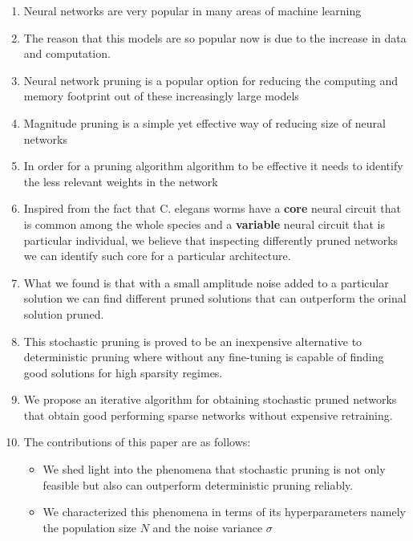 \begin{enumerate}
    \item Neural networks are very popular in many areas of machine learning
    \item The reason that this models are so popular now is due to the increase
        in data and computation.
    \item Neural network pruning is a popular option for reducing the computing
        and memory footprint out of these increasingly large models
    \item Magnitude pruning is a simple yet effective way of reducing size of
        neural networks
    \item In order for a pruning algorithm algorithm to be effective it needs
        to identify the less relevant weights in the network
    \item Inspired from the fact that C. elegans worms have a \textbf{core}
        neural circuit that is common among the whole species and a \textbf{variable}
        neural circuit that is particular individual, we believe that
        inspecting differently pruned networks we can identify such core for a
        particular architecture.
    \item What we found is that with a small amplitude noise added to a
        particular solution we can find different pruned solutions that can
        outperform the orinal solution pruned.
    \item This stochastic pruning is proved to be an inexpensive alternative
        to deterministic pruning where without any fine-tuning is capable of
        finding good solutions for high sparsity regimes.
    \item We propose an iterative algorithm for obtaining stochastic pruned
        networks that obtain good performing sparse networks without expensive
        retraining.
        

    \item The contributions of this paper are as follows:
     \begin{itemize}
         \item We shed light into the phenomena that stochastic pruning is not
             only feasible but also can outperform deterministic pruning
             reliably.
         \item  We characterized this phenomena in terms of its hyperparameters
             namely the population size $N$ and the noise variance $\sigma$

     \end{itemize}

\end{enumerate}
    





